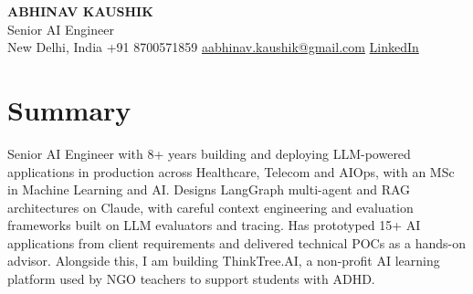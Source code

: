 \documentclass[10pt,a4paper]{article}
\begin{document}
\begin{center}
  {\LARGE\bfseries ABHINAV KAUSHIK}\\[2pt]
  {\large Senior AI Engineer}\\[2pt]
  New Delhi, India \textbar{} +91 8700571859 \textbar{} \href{mailto:aabhinav.kaushik@gmail.com}{aabhinav.kaushik@gmail.com} \textbar{} \href{https://www.linkedin.com/in/abhinav-kaushik10/}{LinkedIn}  
\end{center}

\section{Summary}
Senior AI Engineer with 8+ years building and deploying LLM-powered applications in production across Healthcare, Telecom and AIOps, with an MSc in Machine Learning and AI. Designs LangGraph multi-agent and RAG architectures on Claude, with careful context engineering and evaluation frameworks built on LLM evaluators and tracing. Has prototyped 15+ AI applications from client requirements and delivered technical POCs as a hands-on advisor. Alongside this, I am building ThinkTree.AI, a non-profit AI learning platform used by NGO teachers to support students with ADHD.
\end{document}
